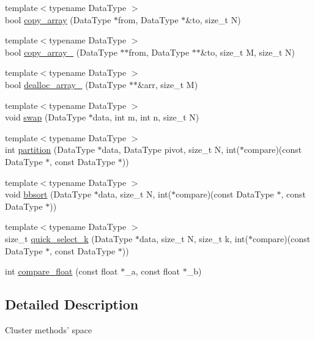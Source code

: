 \begin{DoxyCompactItemize}
\item 
{\footnotesize template$<$typename Data\-Type $>$ }\\bool \hyperlink{namespaceSimpleCluster_a0639106c2ddf850801bd10f3ffb8de6f}{copy\-\_\-array} (Data\-Type $\ast$from, Data\-Type $\ast$\&to, size\-\_\-t N)
\item 
{\footnotesize template$<$typename Data\-Type $>$ }\\bool \hyperlink{namespaceSimpleCluster_a9bc5fb00d7a05159e5c7ba1b27e0273f}{copy\-\_\-array\-\_} (Data\-Type $\ast$$\ast$from, Data\-Type $\ast$$\ast$\&to, size\-\_\-t M, size\-\_\-t N)
\item 
{\footnotesize template$<$typename Data\-Type $>$ }\\bool \hyperlink{namespaceSimpleCluster_a22acb50e58f0867d2ee468f7f395f691}{dealloc\-\_\-array\-\_} (Data\-Type $\ast$$\ast$\&arr, size\-\_\-t M)
\item 
{\footnotesize template$<$typename Data\-Type $>$ }\\void \hyperlink{namespaceSimpleCluster_aefa29bb93b88e6235d7a7c3be4181bf7}{swap} (Data\-Type $\ast$data, int m, int n, size\-\_\-t N)
\item 
{\footnotesize template$<$typename Data\-Type $>$ }\\int \hyperlink{namespaceSimpleCluster_adcef86d645170d3c6b1c7908866d755e}{partition} (Data\-Type $\ast$data, Data\-Type pivot, size\-\_\-t N, int($\ast$compare)(const Data\-Type $\ast$, const Data\-Type $\ast$))
\item 
{\footnotesize template$<$typename Data\-Type $>$ }\\void \hyperlink{namespaceSimpleCluster_acbdd21892a0a82f32c6d1851a7044f37}{bbsort} (Data\-Type $\ast$data, size\-\_\-t N, int($\ast$compare)(const Data\-Type $\ast$, const Data\-Type $\ast$))
\item 
{\footnotesize template$<$typename Data\-Type $>$ }\\size\-\_\-t \hyperlink{namespaceSimpleCluster_a3ff7d10652b776ae35a941228850d904}{quick\-\_\-select\-\_\-k} (Data\-Type $\ast$data, size\-\_\-t N, size\-\_\-t k, int($\ast$compare)(const Data\-Type $\ast$, const Data\-Type $\ast$))
\item 
int \hyperlink{namespaceSimpleCluster_a57e590366bb86afc838a63d619245952}{compare\-\_\-float} (const float $\ast$\-\_\-a, const float $\ast$\-\_\-b)
\end{DoxyCompactItemize}


\subsection{Detailed Description}
Cluster methods' space

